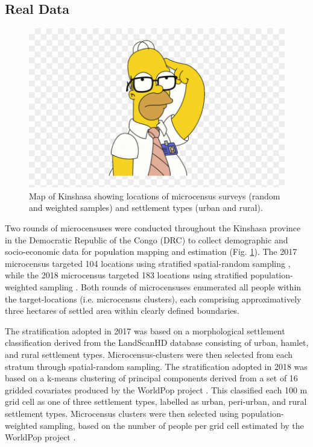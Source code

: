 \documentclass[9pt,twocolumn,twoside,lineno]{pnas-new}
\begin{document}
{	\subsection{Real Data}
	
	\begin{figure}
		\centering
		\includegraphics[width=1\linewidth]{figs/doh.png}
		\caption{Map of Kinshasa showing locations of microcensus surveys (random and weighted samples) and settlement types (urban and rural).}
		\label{fig:kinshasa}
	\end{figure}
	
	Two rounds of microcensuses were conducted throughout the Kinshasa province in the Democratic Republic of the Congo (DRC) to collect demographic and socio-economic data for population mapping and estimation (Fig. \ref{fig:kinshasa}). The 2017 microcensus targeted 104 locations using stratified spatial-random sampling \cite{}, while the 2018 microcensus targeted 183 locations using stratified population-weighted sampling \cite{}. Both rounds of microcensuses enumerated all people within the target-locations (i.e. microcensus clusters), each comprising approximatively three hectares of settled area within clearly defined boundaries. 
	
	The stratification adopted in 2017 was based on a morphological settlement classification derived from the LandScanHD database \cite{} consisting of urban, hamlet, and rural settlement types. Microcensus-clusters were then selected from each stratum through spatial-random sampling. The stratification adopted in 2018 was based on a k-means clustering of principal components derived from a set of 16 gridded covariates produced by the WorldPop project \cite{}. This classified each 100 m grid cell as one of three settlement types, labelled as urban, peri-urban, and rural settlement types. Microcensus clusters were then selected using population-weighted sampling, based on the number of people per grid cell estimated by the WorldPop project \cite{}.
	
}
\end{document}
